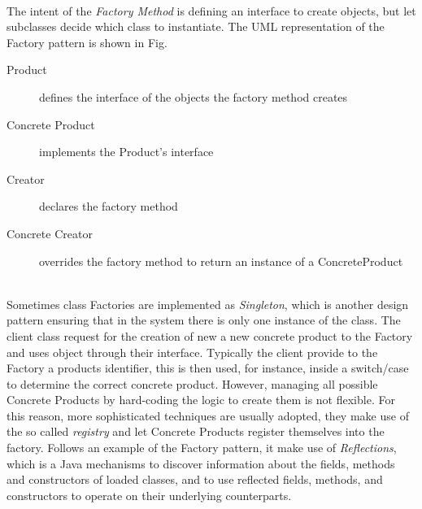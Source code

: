 \paragraph{} The intent of the \textit{Factory Method} is defining an interface to create objects, but let subclasses decide which class to instantiate. The UML representation of the Factory pattern is shown in Fig.


\begin{description}
\item[Product] defines the interface of the objects the factory method creates
\item[Concrete Product] implements the Product’s interface
\item[Creator]declares the factory method
\item[Concrete Creator] overrides the factory method to return an instance of a
ConcreteProduct
\end{description}
\noindent
\\
Sometimes class Factories are implemented as \textit{Singleton}, which is another design pattern ensuring that in the system there is only one instance of the class. The client class request for the creation of new a new concrete product to the Factory and uses object through their interface. Typically the client provide to the Factory a products identifier, this is then used, for instance, inside a switch/case to determine the correct concrete product. However, managing all possible Concrete Products by hard-coding the logic to create them is not flexible. For this reason, more sophisticated techniques are usually adopted, they make use of the so called \textit{registry} and let Concrete Products register themselves into the factory. Follows an example of the Factory pattern, it make use of \textit{Reflections}, which is a Java mechanisms to discover information about the fields, methods and constructors of loaded classes, and to use reflected fields, methods, and constructors to operate on their underlying counterparts.

